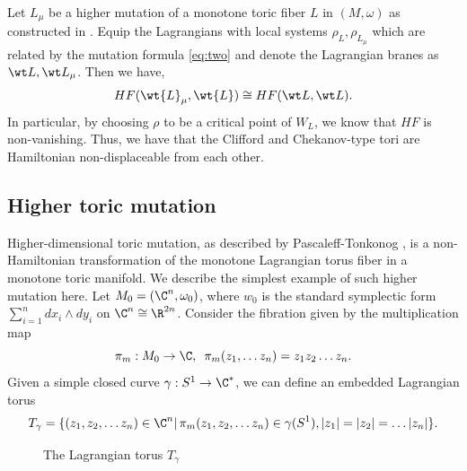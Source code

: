 \begin{cor}\label{cor:chekclif}
    Let $L_\mu$ be a higher mutation of a monotone toric fiber $L$ in $(M,\omega)$ as constructed in \cite{wall}. Equip the Lagrangians with local systems $\rho_L, \rho_{L_\mu}$ which are related by the mutation formula \ref{eq:two} and denote the Lagrangian branes as $\wt L, \wt L_\mu$. Then we have, $$HF(\wt{L}_\mu,\wt{L}) \cong HF(\wt L , \wt L).$$
    In particular, by choosing $\rho$ to be a critical point of $W_L$, we know that $HF$ is non-vanishing. Thus, we have that the Clifford and Chekanov-type tori are Hamiltonian non-displaceable from each other.
\end{cor}


\subsection{Higher toric mutation}
Higher-dimensional toric mutation,  as described by Pascaleff-Tonkonog \cite{wall},  is a non-Hamiltonian transformation of the monotone Lagrangian torus fiber in a monotone toric manifold.  We describe the simplest example of such higher mutation here.  Let $M_0=(\C^n,   \omega_{0})$, where $w_0$ is the standard symplectic form $\sum_{i=1}^{n} dx_i\wedge dy_i$ on $\C^n\cong \R^{2n}$.  Consider the fibration given by the multiplication map
\begin{equation}\label{eq:pim}
    \pi_m : M_0 \to \C,  \,  \,  \,  \pi_m(z_1, \dots z_n) = z_1z_2\dots z_n. 
\end{equation}
Given a simple closed curve $\gamma : S^1 \to \C^* $,  we can define an embedded Lagrangian torus
\begin{equation}
\label{eqn:lagtoru}
T_{\gamma} = \{ (z_1, z_2, \dots z_n) \in \C^n | \, \pi_m  (z_1, z_2, \dots z_n) \in \gamma (S^1) ,   |z_1| = |z_2| = \dots |z_n|\}. 
\end{equation}

\begin{figure}[ht]
    \centering
    \caption{The Lagrangian torus $T_\gamma$ }
    \label{fig:tpic}
\end{figure}

